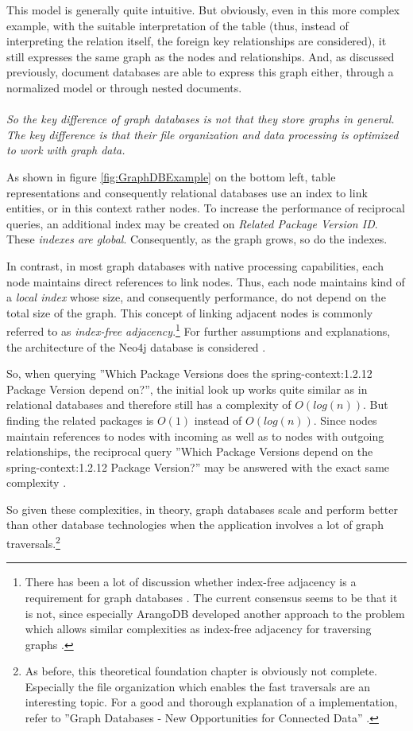 This model is generally quite intuitive. But obviously, even in this more complex example, with the suitable interpretation of the table (thus, instead of interpreting the relation itself, the foreign key relationships are considered), it still expresses the same graph as the nodes and relationships. And, as discussed previously, document databases are able to express this graph either, through a normalized model or through nested documents.\\\\ 
\emph{So the key difference of graph databases is not that they store graphs in general. The key difference is that their file organization and data processing is optimized to work with graph data.}\par
As shown in figure \ref{fig:GraphDBExample} on the bottom left, table representations and consequently relational databases use an index to link entities, or in this context rather nodes. To increase the performance of reciprocal queries, an additional index may be created on \emph{Related Package Version ID}. These \emph{indexes are global}. Consequently, as the graph grows, so do the indexes.\par 
In contrast, in most graph databases with native processing capabilities, each node maintains direct references to link nodes. Thus, each node maintains kind of a \emph{local index} whose size, and consequently performance, do not depend on the total size of the graph. This concept of linking adjacent nodes is commonly referred to as \emph{index-free adjacency}.\footnote{There has been a lot of discussion whether index-free adjacency is a requirement for graph databases \cite{graphdbdiscussion}. The current consensus seems to be that it is not, since especially ArangoDB developed another approach to the problem which allows similar complexities as index-free adjacency for traversing graphs \cite{arangodbhybridindexes}.} For further assumptions and explanations, the architecture of the Neo4j database is considered \cite{neo4j}.\par
So, when querying ''Which Package Versions does the spring-context:1.2.12 Package Version depend on?'', the initial look up works quite similar as in relational databases and therefore still has a complexity of $O(log(n))$. But finding the related packages is $O(1)$ instead of $O(log(n))$. Since nodes maintain references to nodes with incoming as well as to nodes with outgoing relationships, the reciprocal query ''Which Package Versions depend on the spring-context:1.2.12 Package Version?'' may be answered with the exact same complexity \cite{neo4j}.\par 
So given these complexities, in theory, graph databases scale and perform better than other database technologies when the application involves a lot of graph traversals.\footnote{As before, this theoretical foundation chapter is obviously not complete. Especially the file organization which enables the fast traversals are an interesting topic. For a good and thorough explanation of a implementation, refer to ''Graph Databases - New Opportunities for Connected Data'' \cite{neo4j}.}

